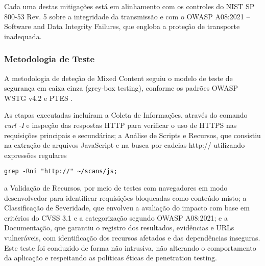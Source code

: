 Cada uma destas mitigações está em alinhamento com os controles do NIST SP 800-53 Rev. 5 sobre a integridade da transmissão e com o OWASP A08:2021 – Software and Data Integrity Failures, que engloba a proteção de transporte inadequada.

\subsubsection{Metodologia de Teste}

A metodologia de deteção de Mixed Content seguiu o modelo de teste de segurança em caixa cinza (grey-box testing), conforme os padrões OWASP WSTG v4.2 e PTES \cite{ref1}. 

As etapas executadas incluíram a Coleta de Informações, através do comando \textit{curl -I} e inspeção das respostas HTTP para verificar o uso de HTTPS nas requisições principais e secundárias; a Análise de Scripts e Recursos, que consistiu na extração de arquivos JavaScript e na busca por cadeias http:// utilizando expressões regulares 
\begin{verbatim}
grep -Rni "http://" ~/scans/js; 
\end{verbatim}
a Validação de Recursos, por meio de testes com navegadores em modo desenvolvedor para identificar requisições bloqueadas como conteúdo misto; a Classificação de Severidade, que envolveu a avaliação do impacto com base em critérios do CVSS 3.1 \cite{ref46} e a categorização segundo OWASP A08:2021; e a Documentação, que garantiu o registro dos resultados, evidências e URLs vulneráveis, com identificação dos recursos afetados e das dependências inseguras. Este teste foi conduzido de forma não intrusiva, não alterando o comportamento da aplicação e respeitando as políticas éticas de penetration testing.
